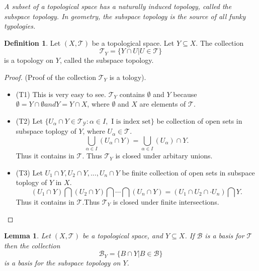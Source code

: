 \documentclass[
]{book}
\providecommand{\tightlist}{%
  \setlength{\itemsep}{0pt}\setlength{\parskip}{0pt}}
\newtheorem{lemma}{Lemma}[chapter]
\theoremstyle{definition}
\newtheorem{definition}{Definition}[chapter]
\theoremstyle{definition}
\theoremstyle{definition}
\theoremstyle{definition}
\theoremstyle{remark}
\begin{document}
\emph{A subset of a topological space has a naturally induced topology, called the subspace topology. In geometry, the subspace topology is the source of all funky typologies.}

\begin{definition}
\protect\hypertarget{def:unnamed-chunk-43}{}\label{def:unnamed-chunk-43}Let \((X, \mathcal{T})\) be a topological space. Let \(Y\subseteq X\). The collection
\[\mathcal{T}_Y = \{Y \cap U | U \in \mathcal{T}\}\] is a topology on \(Y\), called the subspace topology.
\end{definition}

\begin{proof}

(Proof of the collection \(\mathcal{T}_Y\) is a tology).

\begin{itemize}
\tightlist
\item
  (T1) This is very easy to see. \(\mathcal{T}_Y\) contains \(\emptyset\) and \(Y\) because \(\emptyset = Y \cap \emptyset and Y = Y \cap X\), where \(\emptyset\) and \(X\) are elements of \(\mathcal{T}\).
\item
  (T2) Let \(\{U_\alpha \cap Y\in \mathcal{T_Y}:\alpha \in I, \text{ I is index set}\}\) be collection of open sets in subspace toplogy of \(Y\), where \(U_\alpha\in \mathcal{T}\).
  \[\bigcup_{\alpha \in I}\left(U_\alpha\cap Y\right)
    =\bigcup_{\alpha \in I}\left(U_\alpha\right)\cap Y.\]
  Thus it contains in \(\mathcal{T}\). Thus \(\mathcal{T}_Y\) is closed under arbitary unions.
\item
  (T3) Let \(U_1\cap Y, U_2\cap Y,..., U_n\cap Y\) be finite collection of open sets in subspace toplogy of \(Y\) in \(X\).
  \[(U_1\cap Y)\bigcap (U_2\cap Y)\bigcap \cdots \bigcap (U_n\cap Y)=(U_1\cap U_2 \cap \cdot U_n)\bigcap Y.\]
  Thus it contains in \(\mathcal{T}\).Thus \(\mathcal{T}_Y\) is closed under finite intersections.
\end{itemize}

\end{proof}

\begin{lemma}
\protect\hypertarget{lem:unnamed-chunk-45}{}\label{lem:unnamed-chunk-45}Let \((X, \mathcal{T})\) be a topological space, and \(Y\subseteq X\). If \(\mathcal{B}\) is a basis for \(\mathcal{T}\) then the collection
\[\mathcal{B}_Y = \{B \cap Y | B \in \mathcal{B}\}\]
is a basis for the subspace topology on \(Y\).
\end{lemma}
\end{document}
